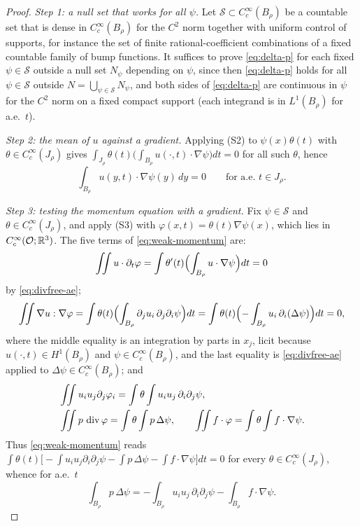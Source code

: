 \documentclass[11pt,reqno]{amsart}
\begin{document}
\begin{proof}
\emph{Step 1: a null set that works for all $\psi$.} Let
$\mathcal{S}\subset C_{c}^{\infty}(B_{\rho})$ be a countable set that is dense in
$C_{c}^{\infty}(B_{\rho})$ for the $C^{2}$ norm together with uniform control of
supports, for instance the set of finite rational-coefficient combinations of a
fixed countable family of bump functions. It suffices to prove
\eqref{eq:delta-p} for each fixed $\psi\in\mathcal{S}$ outside a null set
$N_{\psi}$ depending on $\psi$, since then \eqref{eq:delta-p} holds for all
$\psi\in\mathcal{S}$ outside $N=\bigcup_{\psi\in\mathcal{S}}N_{\psi}$, and both
sides of \eqref{eq:delta-p} are continuous in $\psi$ for the $C^{2}$ norm on a
fixed compact support (each integrand is in $L^{1}(B_{\rho})$ for a.e.\ $t$).

\emph{Step 2: the mean of $u$ against a gradient.} Applying (S2) to
$\psi(x)\theta(t)$ with $\theta\in C_{c}^{\infty}(J_{\rho})$ gives
$\int_{J_{\rho}}\theta(t)\bigl(\int_{B_{\rho}}u(\cdot,t)\cdot\nabla\psi\bigr)dt=0$
for all such $\theta$, hence
\begin{equation}\label{eq:divfree-ae}
  \int_{B_{\rho}}u(y,t)\cdot\nabla\psi(y)\,dy=0
  \qquad\text{for a.e.\ }t\in J_{\rho} .
\end{equation}

\emph{Step 3: testing the momentum equation with a gradient.} Fix
$\psi\in\mathcal{S}$ and $\theta\in C_{c}^{\infty}(J_{\rho})$, and apply (S3)
with $\varphi(x,t)=\theta(t)\nabla\psi(x)$, which lies in
$C_{c}^{\infty}(\mathcal{O};\mathbb{R}^{3})$. The five terms of
\eqref{eq:weak-momentum} are:
\[
  \iint u\cdot\partial_{t}\varphi
  =\int\theta'(t)\Bigl(\int_{B_{\rho}}u\cdot\nabla\psi\Bigr)dt=0
\]
by \eqref{eq:divfree-ae};
\[
  \iint\nabla u:\nabla\varphi
  =\int\theta(t)\Bigl(\int_{B_{\rho}}\partial_{j}u_{i}\,\partial_{j}\partial_{i}\psi\Bigr)dt
  =\int\theta(t)\Bigl(-\int_{B_{\rho}}u_{i}\,\partial_{i}(\Delta\psi)\Bigr)dt=0 ,
\]
where the middle equality is an integration by parts in $x_{j}$, licit because
$u(\cdot,t)\in H^{1}(B_{\rho})$ and $\psi\in C_{c}^{\infty}(B_{\rho})$, and the
last equality is \eqref{eq:divfree-ae} applied to $\Delta\psi\in
C_{c}^{\infty}(B_{\rho})$; and
\[
\begin{aligned}
  &\iint u_{i}u_{j}\partial_{j}\varphi_{i}
   =\int\theta\int u_{i}u_{j}\,\partial_{i}\partial_{j}\psi,\\
  &\iint p\,\operatorname{div}\varphi=\int\theta\int p\,\Delta\psi,
  \qquad
  \iint f\cdot\varphi=\int\theta\int f\cdot\nabla\psi .
\end{aligned}
\]
Thus \eqref{eq:weak-momentum} reads
$\int\theta(t)\bigl[-\int u_{i}u_{j}\partial_{i}\partial_{j}\psi
 -\int p\,\Delta\psi-\int f\cdot\nabla\psi\bigr]dt=0$ for every
$\theta\in C_{c}^{\infty}(J_{\rho})$, whence for a.e.\ $t$
\begin{equation}\label{eq:delta-p-raw}
  \int_{B_{\rho}}p\,\Delta\psi
  =-\int_{B_{\rho}}u_{i}u_{j}\,\partial_{i}\partial_{j}\psi
   -\int_{B_{\rho}}f\cdot\nabla\psi .
\end{equation}


\end{proof}
\end{document}

